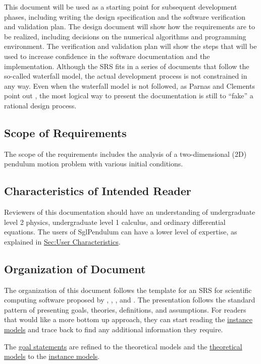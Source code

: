 \documentclass[12pt]{article}
\begin{document}
This document will be used as a starting point for subsequent development phases, including writing the design specification and the software verification and validation plan. The design document will show how the requirements are to be realized, including decisions on the numerical algorithms and programming environment. The verification and validation plan will show the steps that will be used to increase confidence in the software documentation and the implementation. Although the SRS fits in a series of documents that follow the so-called waterfall model, the actual development process is not constrained in any way. Even when the waterfall model is not followed, as Parnas and Clements point out \cite{parnasClements1986}, the most logical way to present the documentation is still to ``fake'' a rational design process.

\subsection{Scope of Requirements}
\label{Sec:ReqsScope}
The scope of the requirements includes the analysis of a two-dimensional (2D) pendulum motion problem with various initial conditions.

\subsection{Characteristics of Intended Reader}
\label{Sec:ReaderChars}
Reviewers of this documentation should have an understanding of undergraduate level 2 physics, undergraduate level 1 calculus, and ordinary differential equations. The users of SglPendulum can have a lower level of expertise, as explained in \hyperref[Sec:UserChars]{Sec:User Characteristics}.

\subsection{Organization of Document}
\label{Sec:DocOrg}
The organization of this document follows the template for an SRS for scientific computing software proposed by \cite{koothoor2013}, \cite{smithLai2005}, \cite{smithEtAl2007}, and \cite{smithKoothoor2016}. The presentation follows the standard pattern of presenting goals, theories, definitions, and assumptions. For readers that would like a more bottom up approach, they can start reading the \hyperref[Sec:IMs]{instance models} and trace back to find any additional information they require.

The \hyperref[Sec:GoalStmt]{goal statements} are refined to the theoretical models and the \hyperref[Sec:TMs]{theoretical models} to the \hyperref[Sec:IMs]{instance models}.
\end{document}
